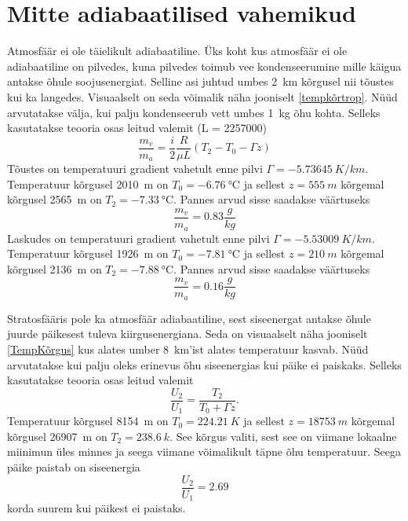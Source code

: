 \documentclass{trkut}%
\begin{document}
\section{Mitte adiabaatilised vahemikud}
Atmosfäär ei ole täielikult adiabaatiline. Üks koht kus atmosfäär ei ole adiabaatiline on pilvedes, kuna pilvedes toimub vee kondenseerumine mille käigua antakse õhule soojusenergiat. Selline asi juhtud umbes \SI{2}{km} kõrgusel nii tõustes kui ka langedes. Visuaalselt on seda võimalik näha jooniselt \ref{tempkõrtrop}. Nüüd arvutatakse välja, kui palju kondenseerub vett umbes \SI{1}{kg} õhu kohta. Selleks kasutatakse teooria osas leitud valemit (L = 2257000)
\begin{equation*}
\frac{m_v}{m_a} = \frac{i}{2}\frac{R}{\mu L}\left(T_2- T_0 - \Gamma z\right)
\end{equation*}
Tõustes on temperatuuri gradient vahetult enne pilvi $\Gamma = \SI{-5.73645}{K/km}$. Temperatuur kõrgusel \SI{2010}{m} on $T_0 = \SI{-6.76}{\degreeCelsius}$ ja sellest $z = \SI{555}{m}$ kõrgemal kõrgusel \SI{2565}{m} on $T_2 = \SI{-7.33}{\degreeCelsius}$. Pannes arvud sisse saadakse väärtuseks
\begin{equation*}
\frac{m_v}{m_a} = 0.83 \frac{g}{kg}
\end{equation*}
Laskudes on temperatuuri gradient vahetult enne pilvi $\Gamma = \SI{-5.53009}{K/km}$. Temperatuur kõrgusel \SI{1926}{m} on $T_0 = \SI{-7.81}{\degreeCelsius}$ ja sellest $z = \SI{210}{m}$ kõrgemal kõrgusel \SI{2136}{m} on $T_2 = \SI{-7.88}{\degreeCelsius}$. Pannes arvud sisse saadakse väärtuseks
\begin{equation*}
\frac{m_v}{m_a} = 0.16 \frac{g}{kg}
\end{equation*}

Stratosfääris pole ka atmosfäär adiabaatiline, sest siseenergat antakse õhule juurde päikesest tuleva kiirgusenergiana. Seda on visuaalselt näha jooniselt \ref{TempKõrgus} kus alates umber \SI{8}{km}'ist alates temperatuur kasvab. Nüüd arvutatakse kui palju oleks erinevus õhu siseenergias kui päike ei paiskaks. Selleks kasutatakse teooria osas leitud valemit
\begin{equation*}
\frac{U_2}{U_1} = \frac{T_2}{T_0+\Gamma z}.
\end{equation*}
Temperatuur kõrgusel \SI{8154}{m} on $T_0 = \SI{224.21}{K}$ ja sellest $z = \SI{18753}{m}$ kõrgemal kõrgusel \SI{26907}{m} on $T_2 = \SI{238.6}{k}$. See kõrgus valiti, sest see on viimane lokaalne miinimun üles minnes ja seega viimane võimalikult täpne õhu temperatuur. Seega päike paistab on siseenergia 
\begin{equation*}
\frac{U_2}{U_1} = 2.69
\end{equation*}
korda suurem kui päikest ei paistaks.
\end{document}
